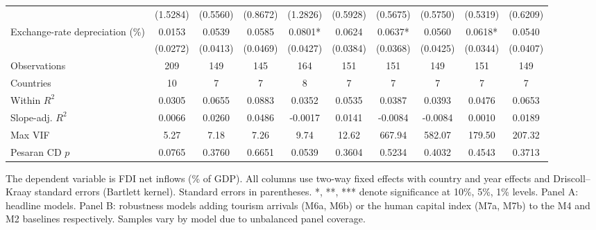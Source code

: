 \begin{table}[htbp]
\begin{threeparttable}
{\begin{tabular}{lccccccccc}
 & (1.5284) & (0.5560) & (0.8672) & (1.2826) & (0.5928) & (0.5675) & (0.5750) & (0.5319) & (0.6209) \\
Exchange-rate depreciation (\%) & 0.0153 & 0.0539 & 0.0585 & 0.0801* & 0.0624 & 0.0637* & 0.0560 & 0.0618* & 0.0540 \\
 & (0.0272) & (0.0413) & (0.0469) & (0.0427) & (0.0384) & (0.0368) & (0.0425) & (0.0344) & (0.0407) \\
Observations & 209 & 149 & 145 & 164 & 151 & 151 & 149 & 151 & 149 \\
Countries & 10 & 7 & 7 & 8 & 7 & 7 & 7 & 7 & 7 \\
Within $R^2$ & 0.0305 & 0.0655 & 0.0883 & 0.0352 & 0.0535 & 0.0387 & 0.0393 & 0.0476 & 0.0653 \\
Slope-adj. $R^2$ & 0.0066 & 0.0260 & 0.0486 & -0.0017 & 0.0141 & -0.0084 & -0.0084 & 0.0010 & 0.0189 \\
Max VIF & 5.27 & 7.18 & 7.26 & 9.74 & 12.62 & 667.94 & 582.07 & 179.50 & 207.32 \\
Pesaran CD $p$ & 0.0765 & 0.3760 & 0.6651 & 0.0539 & 0.3604 & 0.5234 & 0.4032 & 0.4543 & 0.3713 \\
\bottomrule
\end{tabular}
}
\begin{tablenotes}[flushleft]
\footnotesize
\item The dependent variable is FDI net inflows (\% of GDP). All columns use two-way fixed effects with country and year effects and Driscoll--Kraay standard errors (Bartlett kernel). Standard errors in parentheses. *, **, *** denote significance at 10\%, 5\%, 1\% levels. Panel A: headline models. Panel B: robustness models adding tourism arrivals (M6a, M6b) or the human capital index (M7a, M7b) to the M4 and M2 baselines respectively. Samples vary by model due to unbalanced panel coverage.
\end{tablenotes}
\end{threeparttable}
\end{table}